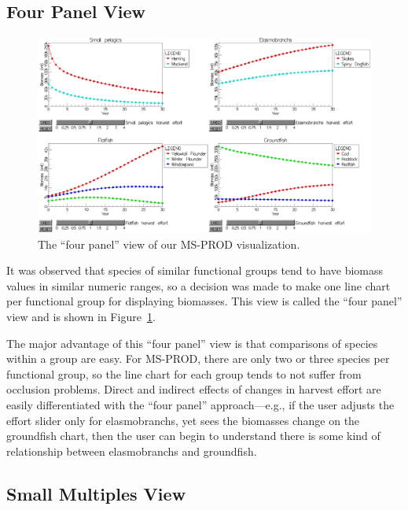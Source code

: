 \subsection{Four Panel View}

\begin{figure}[h]
	\centering
	\includegraphics[width=14cm]{figures/eps/msprod_group.eps}
	\caption{The ``four panel'' view of our MS-PROD visualization.}
	\label{fig:msprod_group}
\end{figure}

It was observed that species of similar functional groups tend to have biomass values in similar numeric ranges, so a decision was made to make one line chart per functional group for displaying biomasses.  This view is called the ``four panel'' view and is shown in Figure~\ref{fig:msprod_group}.

The major advantage of this ``four panel'' view is that comparisons of species within a group are easy.  For MS-PROD, there are only two or three species per functional group, so the line chart for each group tends to not suffer from occlusion problems.  Direct and indirect effects of changes in harvest effort are easily differentiated with the ``four panel'' approach---e.g., if the user adjusts the effort slider only for elasmobranchs, yet sees the biomasses change on the groundfish chart, then the user can begin to understand there is some kind of relationship between elasmobranchs and groundfish.

\subsection{Small Multiples View}

